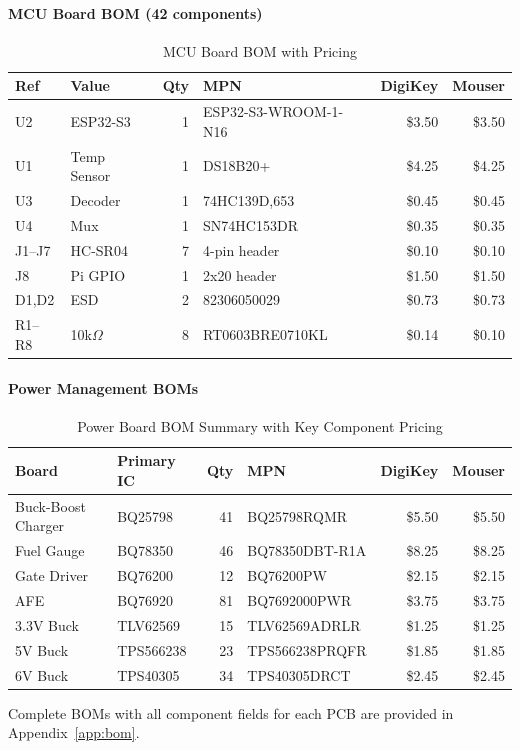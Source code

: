\paragraph{MCU Board BOM (42 components)}
\begin{table}[H]
\centering
\caption{MCU Board BOM with Pricing}
\label{tab:bom-mcu-full}
\footnotesize
\begin{tabular}{@{}llrlrr@{}}
\toprule
\textbf{Ref} & \textbf{Value} & \textbf{Qty} & \textbf{MPN} & \textbf{DigiKey} & \textbf{Mouser} \\
\midrule
U2 & ESP32-S3 & 1 & ESP32-S3-WROOM-1-N16 & \$3.50 & \$3.50 \\
U1 & Temp Sensor & 1 & DS18B20+ & \$4.25 & \$4.25 \\
U3 & Decoder & 1 & 74HC139D,653 & \$0.45 & \$0.45 \\
U4 & Mux & 1 & SN74HC153DR & \$0.35 & \$0.35 \\
J1--J7 & HC-SR04 & 7 & 4-pin header & \$0.10 & \$0.10 \\
J8 & Pi GPIO & 1 & 2x20 header & \$1.50 & \$1.50 \\
D1,D2 & ESD & 2 & 82306050029 & \$0.73 & \$0.73 \\
R1--R8 & 10k$\Omega$ & 8 & RT0603BRE0710KL & \$0.14 & \$0.10 \\
\bottomrule
\end{tabular}
\end{table}

\paragraph{Power Management BOMs}
\begin{table}[H]
\centering
\caption{Power Board BOM Summary with Key Component Pricing}
\label{tab:bom-power}
\footnotesize
\begin{tabular}{@{}llrlrr@{}}
\toprule
\textbf{Board} & \textbf{Primary IC} & \textbf{Qty} & \textbf{MPN} & \textbf{DigiKey} & \textbf{Mouser} \\
\midrule
Buck-Boost Charger & BQ25798 & 41 & BQ25798RQMR & \$5.50 & \$5.50 \\
Fuel Gauge & BQ78350 & 46 & BQ78350DBT-R1A & \$8.25 & \$8.25 \\
Gate Driver & BQ76200 & 12 & BQ76200PW & \$2.15 & \$2.15 \\
AFE & BQ76920 & 81 & BQ7692000PWR & \$3.75 & \$3.75 \\
3.3V Buck & TLV62569 & 15 & TLV62569ADRLR & \$1.25 & \$1.25 \\
5V Buck & TPS566238 & 23 & TPS566238PRQFR & \$1.85 & \$1.85 \\
6V Buck & TPS40305 & 34 & TPS40305DRCT & \$2.45 & \$2.45 \\
\bottomrule
\end{tabular}
\end{table}

Complete BOMs with all component fields for each PCB are provided in Appendix~\ref{app:bom}.
